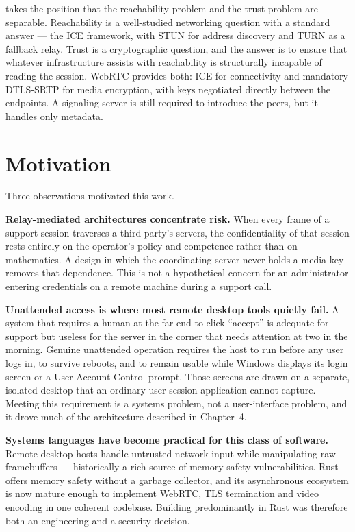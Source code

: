 \updesk{} takes the position that the reachability problem and the trust problem
are separable. Reachability is a well-studied networking question with a
standard answer --- the ICE framework, with STUN for address discovery and TURN
as a fallback relay. Trust is a cryptographic question, and the answer is to
ensure that whatever infrastructure assists with reachability is structurally
incapable of reading the session. WebRTC provides both: ICE for connectivity and
mandatory DTLS-SRTP for media encryption, with keys negotiated directly between
the endpoints. A signaling server is still required to introduce the peers, but
it handles only metadata.

\section{Motivation}

Three observations motivated this work.

\textbf{Relay-mediated architectures concentrate risk.} When every frame of a
support session traverses a third party's servers, the confidentiality of that
session rests entirely on the operator's policy and competence rather than on
mathematics. A design in which the coordinating server never holds a media key
removes that dependence. This is not a hypothetical concern for an
administrator entering credentials on a remote machine during a support call.

\textbf{Unattended access is where most remote desktop tools quietly fail.} A
system that requires a human at the far end to click ``accept'' is adequate for
support but useless for the server in the corner that needs attention at two in
the morning. Genuine unattended operation requires the host to run before any
user logs in, to survive reboots, and to remain usable while Windows displays
its login screen or a User Account Control prompt. Those screens are drawn on a
separate, isolated desktop that an ordinary user-session application cannot
capture. Meeting this requirement is a systems problem, not a user-interface
problem, and it drove much of the architecture described in Chapter~4.

\textbf{Systems languages have become practical for this class of software.}
Remote desktop hosts handle untrusted network input while manipulating raw
framebuffers --- historically a rich source of memory-safety vulnerabilities.
Rust offers memory safety without a garbage collector, and its asynchronous
ecosystem is now mature enough to implement WebRTC, TLS termination and video
encoding in one coherent codebase. Building \updesk{} predominantly in Rust was
therefore both an engineering and a security decision.

